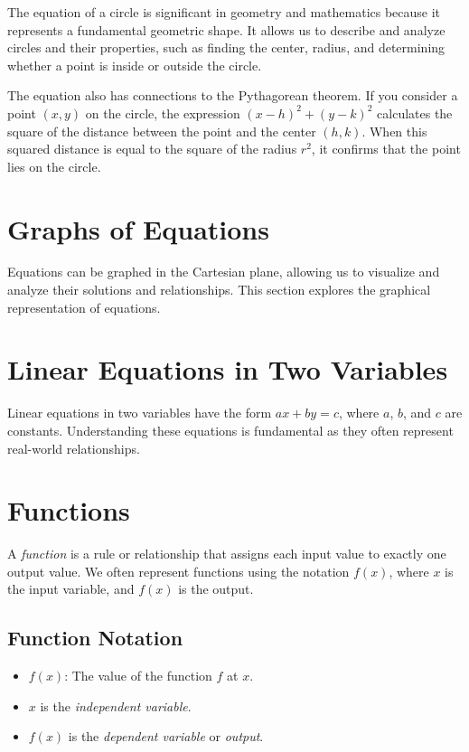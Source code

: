 \documentclass{article}
\begin{document}
The equation of a circle is significant in geometry and mathematics because it represents a fundamental geometric shape. It allows us to describe and analyze circles and their properties, such as finding the center, radius, and determining whether a point is inside or outside the circle.

The equation also has connections to the Pythagorean theorem. If you consider a point $(x, y)$ on the circle, the expression $(x - h)^2 + (y - k)^2$ calculates the square of the distance between the point and the center $(h, k)$. When this squared distance is equal to the square of the radius $r^2$, it confirms that the point lies on the circle.


\section{Graphs of Equations}

Equations can be graphed in the Cartesian plane, allowing us to visualize and analyze their solutions and relationships. This section explores the graphical representation of equations.

\section{Linear Equations in Two Variables}

Linear equations in two variables have the form $ax + by = c$, where $a$, $b$, and $c$ are constants. Understanding these equations is fundamental as they often represent real-world relationships.

\section{Functions}

A \emph{function} is a rule or relationship that assigns each input value to exactly one output value. We often represent functions using the notation $f(x)$, where $x$ is the input variable, and $f(x)$ is the output.

\subsection{Function Notation}

\begin{itemize}
    \item $f(x)$: The value of the function $f$ at $x$.
    \item $x$ is the \emph{independent variable}.
    \item $f(x)$ is the \emph{dependent variable} or \emph{output}.
\end{itemize}
\end{document}
